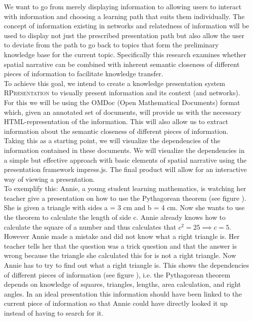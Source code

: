 \documentclass[twoside, 12pt]{article}
\newcommand{\sys}{\textsc{RPresentation}\xspace}
\begin{document}
We want to go from merely displaying information to allowing users to interact with information and choosing a learning path that suits them individually. The concept of information existing in networks and relatedness of information will be used to display not just the prescribed presentation path but also allow the user to deviate from the path to go back to topics that form the preliminary knowledge base for the current topic. Specifically this research examines whether spatial narrative can be combined with inherent semantic closeness of different pieces of information to facilitate knowledge transfer.\\

To achieve this goal, we intend to create a knowledge presentation system \sys to visually present information and its context (and networks). For this we will be using the OMDoc (Open Mathematical Documents) format which, given an annotated set of documents, will provide us with the necessary HTML-representation of the information. This will also allow us to extract information about the semantic closeness of different pieces of information. Taking this as a starting point, we will visualize the dependencies of the information contained in these documents. We will visualize the dependencies in a simple but effective approach with basic elements of spatial narrative using the presentation framework impress.js. The final product will allow for an interactive way of viewing a presentation.\\

To exemplify this: Annie, a young student learning mathematics, is watching her teacher give a presentation on how to use the Pythagorean theorem (see figure %
). She is given a triangle with sides a = 3 cm and b = 4 cm. Now she wants to use the theorem to calculate the length of side c. Annie already knows how to calculate the square of a number and thus calculates that $c^2 = 25 \implies c = 5$. However Annie made a mistake and did not know what a right triangle is. Her teacher tells her that the question was a trick question and that the answer is wrong because the triangle she calculated this for is not a right triangle. Now Annie has to try to find out what a right triangle is. This shows the dependencies of different pieces of information (see figure %
), i.e. the Pythagorean theorem depends on knowledge of squares, triangles, lengths, area calculation, and right angles. In an ideal presentation this information should have been linked to the current piece of information so that Annie could have directly looked it up instead of having to search for it.\\
\end{document}
